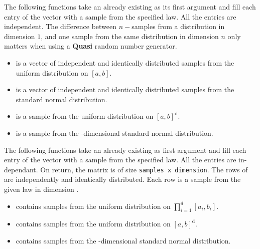 The following functions take an already existing \ptr  as
its first argument and fill each entry of the vector with a sample from the
specified law. All the entries are independent. The difference between
$n-$samples from a distribution in dimension $1$, and one sample from the same
distribution in dimension $n$ only matters when using a {\bf Quasi} random
number generator.
\begin{itemize}
\item {}
  \sshortdescribe {} is a vector of independent and identically distributed
  samples from the uniform distribution on $[a, b]$.

\item {}
  \sshortdescribe {} is a vector of independent and identically distributed
  samples from the standard normal distribution.

\item {}
  \sshortdescribe {} is a sample from the uniform distribution on $[a,
  b]^{\text{d}}$.

\item {}
  \sshortdescribe {} is a sample from the -dimensional
  standard normal distribution.

\end{itemize}

The following functions take an already existing \ptr  as
first argument and fill each entry of the vector with a sample from the
specified law. All the entries are in-dependant. On return, the matrix 
is of size \verb!samples x dimension!. The rows of  are independently
and identically distributed. Each row is a sample from the given law in
dimension .
\begin{itemize}
\item {}
  \sshortdescribe {} contains  samples from the uniform
  distribution on $\prod_{i=1}^d [a_i, b_i]$.

\item {}
  \sshortdescribe {} contains  samples from the uniform
  distribution on $[a, b]^{\text{d}}$.

\item {}
  \sshortdescribe {} contains  samples from the
  -dimensional standard normal distribution.
\end{itemize}

